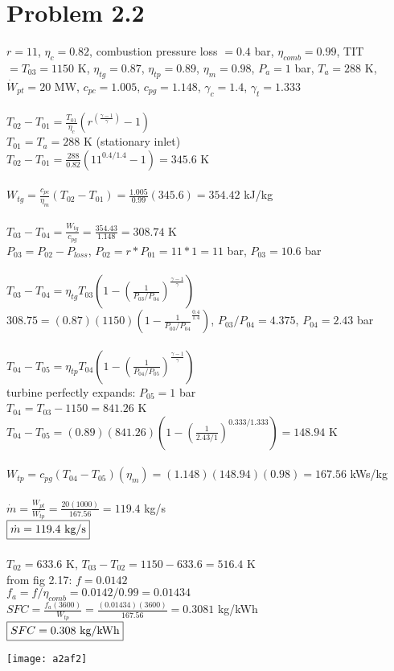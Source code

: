 \documentclass{article}
\begin{document}
\section*{Problem 2.2}
$r=11$, $\eta_c=0.82$, combustion pressure loss $=0.4$ bar, $\eta_{comb}=0.99$,
TIT$=T_{03}=1150$ K, $\eta_{tg}=0.87$, $\eta_{tp}=0.89$, $\eta_{m}=0.98$, $P_a=1$ bar,
$T_a=288$ K, $\dot{W}_{pt}=20$ MW, $c_{pc}=1.005$, $c_{pg}=1.148$, $\gamma_c=1.4$,
$\gamma_t=1.333$ \\\\
$T_{02} - T_{01}=\frac{T_{01}}{\eta_c}(r^{(\frac{\gamma-1}{\gamma})}-1)$ \\
$T_{01}=T_a=288$ K (stationary inlet) \\
$T_{02} - T_{01}=\frac{288}{0.82}(11^{0.4/1.4}-1)=345.6$ K \\\\
$W_{tg}=\frac{c_{pc}}{\eta_m}(T_{02} - T_{01})=\frac{1.005}{0.99}(345.6)=354.42$ kJ/kg \\\\
$T_{03} - T_{04}=\frac{W_{tg}}{c_{pg}}=\frac{354.43}{1.148}=308.74$ K \\
$P_{03} = P_{02} - P_{loss}$, $P_{02}=r*P_{01}=11*1=11$ bar, $P_{03}=10.6$ bar \\\\
$T_{03} - T_{04}=\eta_{tg}T_{03}(1 - (\frac{1}{P_{03}/P_{04}})^\frac{\gamma-1}{\gamma})$ \\
$308.75=(0.87)(1150)(1-\frac{1}{P_{03}/P_{04}}^{\frac{0.4}{1.4}})$, $P_{03}/P_{04}=4.375$,
$P_{04}=2.43$ bar \\\\
$T_{04} - T_{05}=\eta_{tp}T_{04}(1 - (\frac{1}{P_{04}/P_{05}})^\frac{\gamma-1}{\gamma})$ \\
turbine perfectly expands: $P_{05}=1$ bar \\
$T_{04} = T_{03}-1150 = 841.26$ K \\
$T_{04} - T_{05}=(0.89)(841.26)(1 - (\frac{1}{2.43/1})^{0.333/1.333})=148.94$ K \\\\
$W_{tp}=c_{pg}(T_{04} - T_{05})(\eta_{m})=(1.148)(148.94)(0.98)=167.56$ kWs/kg \\\\
$\dot{m}=\frac{W_{pt}}{W_{tp}}=\frac{20(1000)}{167.56}=119.4$ kg/s\\
$\fbox{$\dot{m}=119.4$ kg/s}$ \\\\
$T_{02}=633.6$ K, $T_{03}-T_{02}=1150-633.6=516.4$ K \\
from fig 2.17: $f=0.0142$ \\
$f_a = f/\eta_{comb} = 0.0142/0.99=0.01434$ \\
$SFC = \frac{f_a(3600)}{W_{tp}}=\frac{(0.01434)(3600)}{167.56}=0.3081$ kg/kWh \\
$\fbox{$SFC=0.308$ kg/kWh}$
\begin{center}
    \texttt{[image: a2af2]}  
\end{center}
\end{document}
